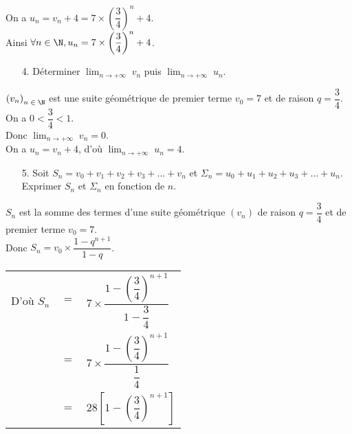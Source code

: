 On a $u_n = v_n + 4 = 7 \times \left(\dfrac{3}{4}\right)^n + 4$. \\

Ainsi $\forall n \in \N, u_n = 7 \times \left(\dfrac{3}{4}\right)^n + 4$. 

\vspace*{-5cm}

\newpage

\vspace*{-1cm}

\begin{itemize}
\item[4.] Déterminer $ \displaystyle {\lim_{n \rightarrow +\infty}} \; v_n$ puis $ \displaystyle {\lim_{n \rightarrow +\infty}} \; u_n$. \\
\end{itemize}

$\left(v_n\right)_{n \; \in \; \N}$ est une suite géométrique de premier terme $v_0 =7$ et de raison $q =\dfrac{3}{4}$. \\

On a $0 < \dfrac{3}{4} < 1$. \\

Donc $ \displaystyle {\lim_{n \rightarrow +\infty}} \; v_n = 0$. \\ 

On a $u_n = v_n + 4$, d'où $ \displaystyle {\lim_{n \rightarrow +\infty}} \; u_n = 4$. \\

\begin{itemize}
\item[5.] Soit $S_n = v_0 + v_1 + v_2 + v_3 + ... + v_n$ et $\Sigma_n = u_0 + u_1 + u_2 + u_3 + ... + u_n$. \\ Exprimer $S_n$ et $\Sigma_n$ en fonction de $n$. \\
\end{itemize}

$S_n$ est la somme des termes d'une suite géométrique $\left(v_n\right)$ de raison $q = \dfrac{3}{4}$ et de premier terme $v_0 = 7$. \\

Donc $S_n = v_0 \times \dfrac{1 - q^{n+1}}{1 - q}$. \\

\begin{tabular}{lll}
D'où $S_n$ & $=$ & $7 \times \dfrac{1 - \left(\dfrac{3}{4}\right)^{n+1}}{1 - \dfrac{3}{4}}$ \vspace*{.3cm} \\
& $=$ & $7 \times \dfrac{1 - \left(\dfrac{3}{4}\right)^{n+1}}{\dfrac{1}{4}}$ \vspace*{.3cm} \\
& $=$ & $28 \left[1 - \left(\dfrac{3}{4}\right)^{n+1}\right]$ \\
\end{tabular}


